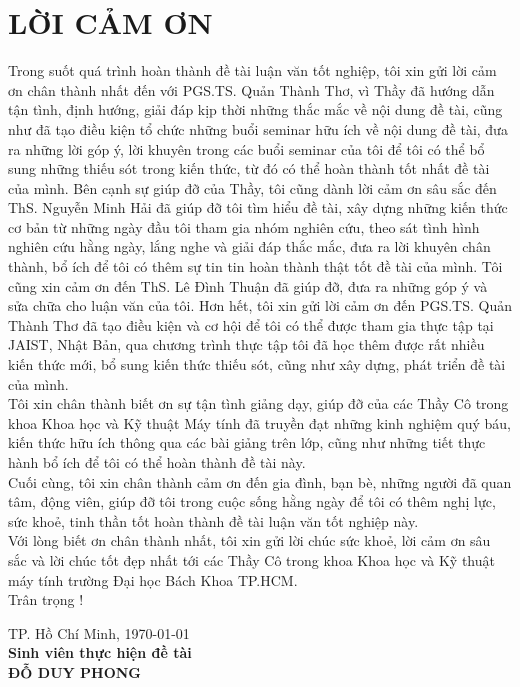 
\newpage
\chapter{LỜI CẢM ƠN}

\setlength\parindent{0pt}
\hspace{0.5cm}Trong suốt quá trình hoàn thành đề tài luận văn tốt nghiệp, tôi xin gửi lời cảm ơn chân thành nhất đến với PGS.TS. Quản Thành Thơ, vì Thầy đã hướng dẫn tận tình, định hướng, giải đáp kịp thời những thắc mắc về nội dung đề tài, cũng như đã tạo điều kiện tổ chức những buổi seminar hữu ích về nội dung đề tài, đưa ra những lời góp ý, lời khuyên trong các buổi seminar của tôi để tôi có thể bổ sung những thiếu sót trong kiến thức, từ đó có thể hoàn thành tốt nhất đề tài của mình. Bên cạnh sự giúp đỡ của Thầy, tôi cũng dành lời cảm ơn sâu sắc đến ThS. Nguyễn Minh Hải đã giúp đỡ tôi tìm hiểu đề tài, xây dựng những kiến thức cơ bản từ những ngày đầu tôi tham gia nhóm nghiên cứu, theo sát tình hình nghiên cứu hằng ngày, lắng nghe và giải đáp thắc mắc, đưa ra lời khuyên chân thành, bổ ích để tôi có thêm sự tin tin hoàn thành thật tốt đề tài của mình. Tôi cũng xin cảm ơn đến ThS. Lê Đình Thuận đã giúp đỡ, đưa ra những góp ý và sửa chữa cho luận văn của tôi. Hơn hết, tôi xin gửi lời cảm ơn đến PGS.TS. Quản Thành Thơ đã tạo điều kiện và cơ hội để tôi có thể được tham gia thực tập tại JAIST, Nhật Bản, qua chương trình thực tập tôi đã học thêm được rất nhiều kiến thức mới, bổ sung kiến thức thiếu sót, cũng như xây dựng, phát triển đề tài của mình.\\

\hspace{0.5cm}Tôi xin chân thành biết ơn sự tận tình giảng dạy, giúp đỡ của các Thầy Cô trong khoa Khoa học và Kỹ thuật Máy tính đã truyền đạt những kinh nghiệm quý báu, kiến thức hữu ích thông qua các bài giảng trên lớp, cũng như những tiết thực hành bổ ích để tôi có thể hoàn thành đề tài này.\\

\hspace{0.5cm}Cuối cùng, tôi xin chân thành cảm ơn đến gia đình, bạn bè, những người đã quan tâm, động viên, giúp đỡ tôi trong cuộc sống hằng ngày để tôi có thêm nghị lực, sức khoẻ, tinh thần tốt hoàn thành đề tài luận văn tốt nghiệp này.\\

\hspace{0.5cm}Với lòng biết ơn chân thành nhất, tôi xin gửi lời chúc sức khoẻ, lời cảm ơn sâu sắc và lời chúc tốt đẹp nhất tới các Thầy Cô trong khoa Khoa học và Kỹ thuật máy tính trường Đại học Bách Khoa TP.HCM.\\

\hspace{0.5cm}Trân trọng !\\

\hspace{5cm}
\begin{minipage}[t]{0.60\linewidth}
	\begin{center}
		TP. Hồ Chí Minh, \today\\
		\textbf{Sinh viên thực hiện đề tài}\\[3cm]
		\textbf{ĐỖ DUY PHONG}
	\end{center}
\end{minipage}

